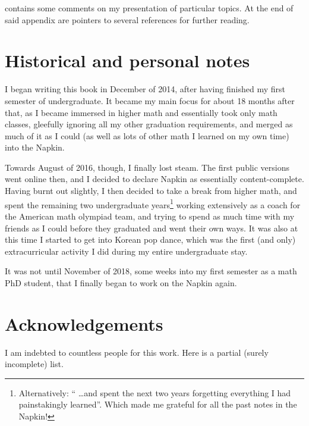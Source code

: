  contains some comments on my presentation
of particular topics.
At the end of said appendix are pointers to
several references for further reading.

\section*{Historical and personal notes}
I began writing this book in December of 2014,
after having finished my first semester of undergraduate.
It became my main focus for about 18 months after that,
as I became immersed in higher math and essentially took only math classes,
gleefully ignoring all my other graduation requirements,
and merged as much of it as I could
(as well as lots of other math I learned on my own time) into the Napkin.

Towards August of 2016, though, I finally lost steam.
The first public versions went online then,
and I decided to declare Napkin as essentially content-complete.
Having burnt out slightly,
I then decided to take a break from higher math,
and spent the remaining two undergraduate years\footnote{Alternatively:
	`` \dots and spent the next two years forgetting everything
	I had painstakingly learned''.
	Which made me grateful for all the past notes in the Napkin!}
working extensively as a coach for the American math olympiad team,
and trying to spend as much time with my friends as I could
before they graduated and went their own ways.
It was also at this time I started to get into Korean pop dance,
which was the first (and only) extracurricular activity
I did during my entire undergraduate stay.

It was not until November of 2018,
some weeks into my first semester as a math PhD student,
that I finally began to work on the Napkin again.

\section*{Acknowledgements}
I am indebted to countless people for this work.
Here is a partial (surely incomplete) list.

